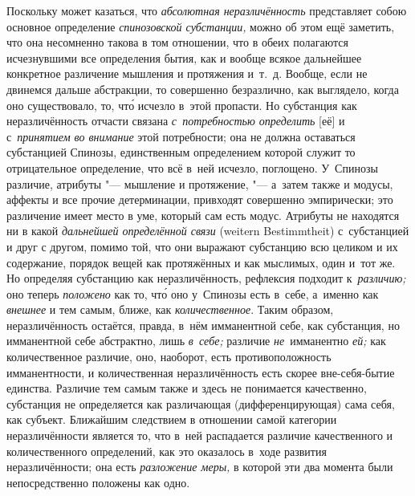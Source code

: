 Поскольку может казаться, что {\em абсолютная неразличённость} представляет
собою основное определение {\em спинозовской субстанции,} можно об этом ещё
заметить, что она несомненно такова в том отношении, что в обеих полагаются
исчезнувшими все определения бытия, как и вообще всякое дальнейшее конкретное
различение мышления и протяжения и~т.~д. Вообще, если не двинемся дальше
абстракции, то совершенно безразлично, как выглядело, когда оно существовало,
то, чт\'{о} исчезло в~этой пропасти. Но субстанция как неразличённость отчасти
связана {\em с~потребностью определить} [её] и с~{\em принятием во внимание}
этой потребности; она не должна оставаться субстанцией Спинозы, единственным
определением которой служит то отрицательное определение, что всё в~ней
исчезло, поглощено. У~Спинозы
различие, атрибуты "--- мышление и протяжение, "--- а~затем также и модусы,
аффекты и все прочие детерминации, привходят совершенно эмпирически; это
различение имеет место в уме, который сам есть модус. Атрибуты не находятся ни
в какой {\em дальнейшей определённой связи} (wei\-tern Be\-stimmt\-heit)
с~субстанцией и друг с другом, помимо той, что они выражают субстанцию всю
целиком и их содержание, порядок вещей как протяжённых и как мыслимых, один
и~тот же. Но определяя субстанцию как неразличённость, рефлексия подходит
к~{\em различию;} оно теперь {\em положено} как то, чт\'{о} оно у~Спинозы есть
в~себе, а~именно как {\em внешнее} и тем самым, ближе, как
{\em количественное}. Таким образом, неразличённость остаётся, правда, в~нём
имманентной себе, как субстанция, но имманентной себе абстрактно, лишь
{\em в~себе;} различие {\em не}~имманентно {\em ей;} как количественное
различие, оно, наоборот, есть противоположность имманентности, и количественная
неразличённость есть скорее вне-себя-бытие единства. Различие тем самым также и
здесь не понимается качественно, субстанция не определяется как различающая
(дифференцирующая) сама себя, как субъект. Ближайшим следствием в отношении
самой категории неразличённости является то, что в~ней распадается различие
качественного и количественного определений, как это оказалось в~ходе развития
неразличённости; она есть {\em разложение меры,} в которой эти два момента были
непосредственно положены как одно.

